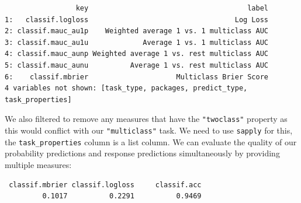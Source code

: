 \begin{Shaded}
\begin{Highlighting}[]
\NormalTok{(}\NormalTok{())[}
\SpecialCharTok{==}  \SpecialCharTok{\&}\SpecialCharTok{==}  \SpecialCharTok{\&}
    \SpecialCharTok{!} \NormalTok{ x)]}
\end{Highlighting}
\end{Shaded}

\begin{verbatim}
                 key                                      label
1:   classif.logloss                                   Log Loss
2: classif.mauc_au1p    Weighted average 1 vs. 1 multiclass AUC
3: classif.mauc_au1u             Average 1 vs. 1 multiclass AUC
4: classif.mauc_aunp Weighted average 1 vs. rest multiclass AUC
5: classif.mauc_aunu          Average 1 vs. rest multiclass AUC
6:    classif.mbrier                     Multiclass Brier Score
4 variables not shown: [task_type, packages, predict_type, task_properties]
\end{verbatim}

We also filtered to remove any measures that have the
\texttt{"twoclass"} property as this would conflict with our
\texttt{"multiclass"} task. We need to use \texttt{sapply} for this, the
\texttt{task\_properties} column is a list column. We can evaluate the
quality of our probability predictions and response predictions
simultaneously by providing multiple measures:

\begin{Shaded}
\begin{Highlighting}[]
\OtherTok{=} \NormalTok{(}\NormalTok{(}\NormalTok{, }\NormalTok{, }\NormalTok{))}
\SpecialCharTok{$}
\end{Highlighting}
\end{Shaded}

\begin{verbatim}
 classif.mbrier classif.logloss     classif.acc 
         0.1017          0.2291          0.9469 
\end{verbatim}

